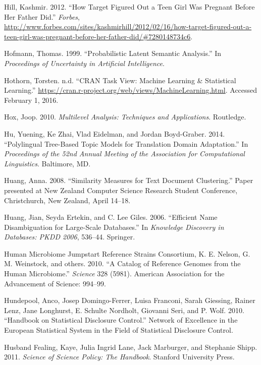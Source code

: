 \documentclass[]{krantz}
\begin{document}
\hypertarget{ref-hill2012target}{}
Hill, Kashmir. 2012. ``How Target Figured Out a Teen Girl Was Pregnant
Before Her Father Did.'' \emph{Forbes},
\url{http://www.forbes.com/sites/kashmirhill/2012/02/16/how-target-figured-out-a-teen-girl-was-pregnant-before-her-father-did/\#7280148734c6}.

\hypertarget{ref-hofmann-99}{}
Hofmann, Thomas. 1999. ``Probabilistic Latent Semantic Analysis.'' In
\emph{Proceedings of Uncertainty in Artificial Intelligence}.

\hypertarget{ref-cranML}{}
Hothorn, Torsten. n.d. ``CRAN Task View: Machine Learning \& Statistical
Learning.''
\url{https://cran.r-project.org/web/views/MachineLearning.html}.
Accessed February 1, 2016.

\hypertarget{ref-hox2010multilevel}{}
Hox, Joop. 2010. \emph{Multilevel Analysis: Techniques and
Applications}. Routledge.

\hypertarget{ref-Hu:Zhai:Eidelman:Boyd-Graber-2014}{}
Hu, Yuening, Ke Zhai, Vlad Eidelman, and Jordan Boyd-Graber. 2014.
``Polylingual Tree-Based Topic Models for Translation Domain
Adaptation.'' In \emph{Proceedings of the 52nd Annual Meeting of the
Association for Computational Linguistics}. Baltimore, MD.

\hypertarget{ref-huang-08}{}
Huang, Anna. 2008. ``Similarity Measures for Text Document Clustering.''
Paper presented at New Zealand Computer Science Research Student
Conference, Christchurch, New Zealand, April 14--18.

\hypertarget{ref-HEG06}{}
Huang, Jian, Seyda Ertekin, and C. Lee Giles. 2006. ``Efficient Name
Disambiguation for Large-Scale Databases.'' In \emph{Knowledge Discovery
in Databases: PKDD 2006}, 536--44. Springer.

\hypertarget{ref-human2010catalog}{}
Human Microbiome Jumpstart Reference Strains Consortium, K. E. Nelson,
G. M. Weinstock, and others. 2010. ``A Catalog of Reference Genomes from
the Human Microbiome.'' \emph{Science} 328 (5981). American Association
for the Advancement of Science: 994--99.

\hypertarget{ref-hundepool2010handbook}{}
Hundepool, Anco, Josep Domingo-Ferrer, Luisa Franconi, Sarah Giessing,
Rainer Lenz, Jane Longhurst, E. Schulte Nordholt, Giovanni Seri, and P.
Wolf. 2010. ``Handbook on Statistical Disclosure Control.'' Network of
Excellence in the European Statistical System in the Field of
Statistical Disclosure Control.

\hypertarget{ref-husband2011science}{}
Husband Fealing, Kaye, Julia Ingrid Lane, Jack Marburger, and Stephanie
Shipp. 2011. \emph{Science of Science Policy: The Handbook}. Stanford
University Press.
\end{document}
